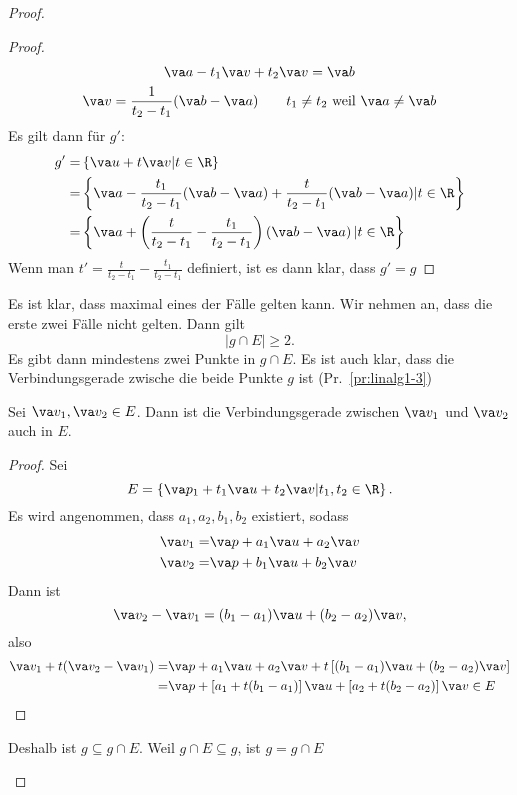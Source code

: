 \begin{proof}
\begin{parts}
\begin{proof}
\begin{gather*}
				\va a-t_1\va v+t_2\va v=\va b\\
				\va v = \frac{1}{t_2-t_1}(\va b - \va a)\qquad t_1\neq t_2\text{ weil }\va a \neq \va b
			\end{gather*}
			Es gilt dann f\"{u}r $g'$: 
			\begin{align*}
				g'=& \left\{ \va u+t\va v|t\in \R \right\} \\
				=& \left\{ \va a-\frac{t_1}{t_2-t_1}(\va b-\va a)+\frac{t}{t_2-t_1}(\va b-\va a)|t\in \R \right\}\\
				=& \left\{\va a+\left( \frac{t}{t_2-t_1}-\frac{t_1}{t_2-t_1} \right) \left( \va b -\va a \right) | t\in \R \right\}
			\end{align*}
			Wenn man $t'=\frac{t}{t_2-t_1}-\frac{t_1}{t_2-t_1}$ definiert, ist es dann klar, dass $g'=g$
		\end{proof}

			Es ist klar, dass maximal eines der F\"{a}lle gelten kann. Wir nehmen an, dass die erste zwei F\"{a}lle nicht gelten. Dann gilt
		\[
		|g\cap E|\ge 2
		.\] 
		Es gibt dann mindestens zwei Punkte in $g\cap E$. Es ist auch klar, dass die Verbindungsgerade zwische die beide Punkte $g$ ist (Pr.~\ref{pr:linalg1-3})


		\begin{Theorem}
			Sei $\va v_1, \va v_2\in E$. Dann ist die Verbindungsgerade zwischen $\va v_1$ und $\va v_2$ auch in $E$.
		\end{Theorem}
		\begin{proof}
			Sei
			\[
			E=\left\{ \va p_1+t_1\va u+t_2\va v|t_1,t_2\in \R \right\} 
			.\] 
			Es wird angenommen, dass $a_1,a_2,b_1,b_2$ existiert, sodass
			\begin{align*}
				\va v_1=& \va p+a_1\va u+a_2\va v\\
				\va v_2=&\va p+b_1\va u+b_2\va v
			\end{align*}
			Dann ist
			\[
			\va v_2-\va v_1=(b_1-a_1)\va u+(b_2-a_2)\va v,\]
			also
			\begin{align*}
				\va v_1+t(\va v_2-\va v_1)=& \va p+a_1\va u+a_2\va v+t\left[ (b_1-a_1)\va u+(b_2-a_2)\va v \right]\\
				=& \va p+\left[ a_1+t(b_1-a_1) \right] \va u+\left[ a_2+t(b_2-a_2) \right] \va v\in E
			\end{align*}
		\end{proof}

		Deshalb ist $g\subseteq g\cap E$. Weil $g\cap E\subseteq g$, ist $g=g\cap E$
	\end{parts}
\end{proof}

